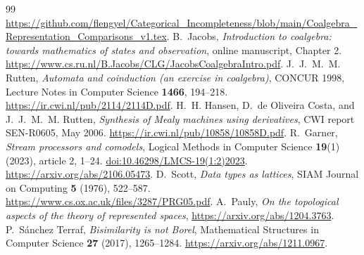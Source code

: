 \documentclass[11pt]{article}
\theoremstyle{definition}
\begin{document}
\begin{thebibliography}{99}
\url{https://github.com/flengyel/Categorical_Incompleteness/blob/main/Coalgebra_Representation_Comparisons_v1.tex}.
 B.~Jacobs, \emph{Introduction to coalgebra: towards mathematics of states and observation},
online manuscript, Chapter 2.
\url{https://www.cs.ru.nl/B.Jacobs/CLG/JacobsCoalgebraIntro.pdf}.
 J.~J.~M.~M. Rutten,
\emph{Automata and coinduction (an exercise in coalgebra)},
CONCUR 1998, Lecture Notes in Computer Science \textbf{1466}, 194--218.
\url{https://ir.cwi.nl/pub/2114/2114D.pdf}.
 H.~H. Hansen, D.~de Oliveira Costa, and J.~J.~M.~M. Rutten,
\emph{Synthesis of Mealy machines using derivatives},
CWI report SEN-R0605, May 2006.
\url{https://ir.cwi.nl/pub/10858/10858D.pdf}.
 R.~Garner, \emph{Stream processors and comodels},
Logical Methods in Computer Science \textbf{19}(1) (2023), article 2, 1--24.
\href{https://doi.org/10.46298/LMCS-19(1:2)2023}{doi:10.46298/LMCS-19(1:2)2023}.
\url{https://arxiv.org/abs/2106.05473}.
 D.~Scott, \emph{Data types as lattices},
SIAM Journal on Computing \textbf{5} (1976), 522--587.
\url{https://www.cs.ox.ac.uk/files/3287/PRG05.pdf}.
 A.~Pauly,
\emph{On the topological aspects of the theory of represented spaces},
\url{https://arxiv.org/abs/1204.3763}.
 P.~S\'anchez Terraf, \emph{Bisimilarity is not Borel},
Mathematical Structures in Computer Science \textbf{27} (2017), 1265--1284.
\url{https://arxiv.org/abs/1211.0967}.
\end{thebibliography}
\end{document}
